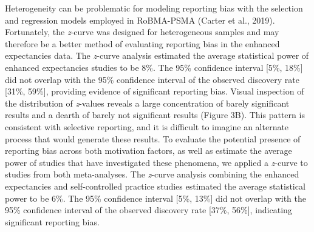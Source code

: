 \documentclass[
  man, donotrepeattitle,mask,floatsintext]{apa7}
\begin{document}
Heterogeneity can be problematic for modeling reporting bias with the selection and regression models employed in RoBMA-PSMA (Carter et al., 2019). Fortunately, the \emph{z}-curve was designed for heterogeneous samples and may therefore be a better method of evaluating reporting bias in the enhanced expectancies data. The \emph{z}-curve analysis estimated the average statistical power of enhanced expectancies studies to be 8\%. The 95\% confidence interval {[}5\%, 18\%{]} did not overlap with the 95\% confidence interval of the observed discovery rate {[}31\%, 59\%{]}, providing evidence of significant reporting bias. Visual inspection of the distribution of \emph{z}-values reveals a large concentration of barely significant results and a dearth of barely not significant results (Figure 3B). This pattern is consistent with selective reporting, and it is difficult to imagine an alternate process that would generate these results. To evaluate the potential presence of reporting bias across both motivation factors, as well as estimate the average power of studies that have investigated these phenomena, we applied a \emph{z}-curve to studies from both meta-analyses. The \emph{z}-curve analysis combining the enhanced expectancies and self-controlled practice studies estimated the average statistical power to be 6\%. The 95\% confidence interval {[}5\%, 13\%{]} did not overlap with the 95\% confidence interval of the observed discovery rate {[}37\%, 56\%{]}, indicating significant reporting bias.
\end{document}
